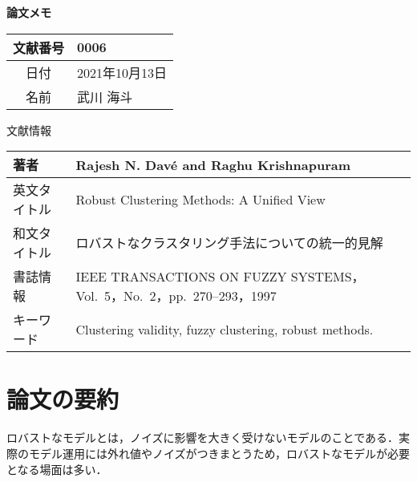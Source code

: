 \documentclass[10pt,onecolumn]{jsarticle}
\begin{document}
\vspace{-20mm}
\begin{center}
{\LARGE\textbf{論文メモ}}
\end{center}

\begin{flushright}
\begin{tabular}{|c|l|}
\hline
文献番号  &  0006
\\
\hline
日付  &  2021年10月13日
\\
\hline
名前  &  武川 海斗
\\
\hline
\end{tabular}
\end{flushright}


%
%
\begin{center}
{\large 文献情報}
\begin{table}[hbp]%
\begin{tabular}{|l||l|}
\hline
著者  &  Rajesh N. Dav\'{e} and Raghu Krishnapuram
\\ \hline
英文タイトル  & Robust Clustering Methods: A Unified View
\\ \hline
和文タイトル  & ロバストなクラスタリング手法についての統一的見解
\\ \hline
書誌情報  &  IEEE TRANSACTIONS ON FUZZY SYSTEMS，Vol.~5，No.~2，pp.~270--293，1997
\\ \hline
キーワード & Clustering validity, fuzzy clustering, robust methods.
\\ \hline
\end{tabular}
\end{table}
\end{center}


\section{論文の要約}
ロバストなモデルとは，ノイズに影響を大きく受けないモデルのことである．実際のモデル運用には外れ値やノイズがつきまとうため，ロバストなモデルが必要となる場面は多い．
\end{document}
